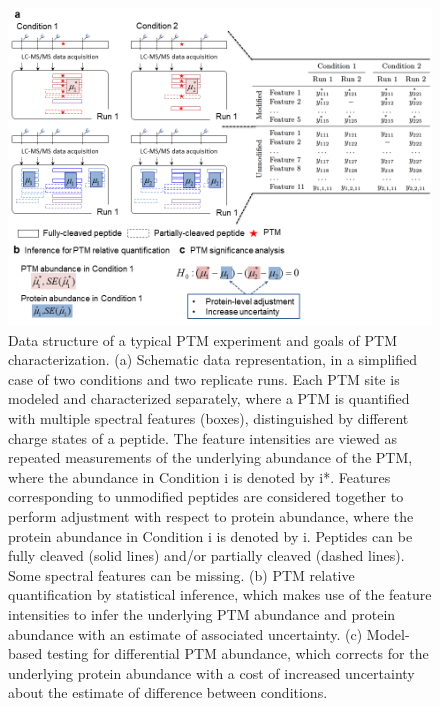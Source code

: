 \documentclass[mcp]{article}
\numberwithin{table}{section}
\begin{document}
\begin{figure}[ht]
\centering
\includegraphics[scale=.65]{images/fig3.png}
\caption{
Data structure of a typical PTM experiment and goals of PTM characterization. (a) Schematic data representation, in a simplified case of two conditions and two replicate runs. Each PTM site is modeled and characterized separately, where a PTM is quantified with multiple spectral features (boxes), distinguished by different charge states of a peptide. The feature intensities are viewed as repeated measurements of the underlying abundance of the PTM, where the abundance in Condition i is denoted by i*. Features corresponding to unmodified peptides are considered together to perform adjustment with respect to protein abundance, where the protein abundance in Condition i is denoted by i. Peptides can be fully cleaved (solid lines) and/or partially cleaved (dashed lines). Some spectral features can be missing. (b) PTM relative quantification by statistical inference, which makes use of the feature intensities to infer the underlying PTM abundance and protein abundance with an estimate of associated uncertainty. (c) Model-based testing for differential PTM abundance, which corrects for the underlying protein abundance with a cost of increased uncertainty about the estimate of difference between conditions.}
\label{fig:data-structure}
\end{figure}
\end{document}
